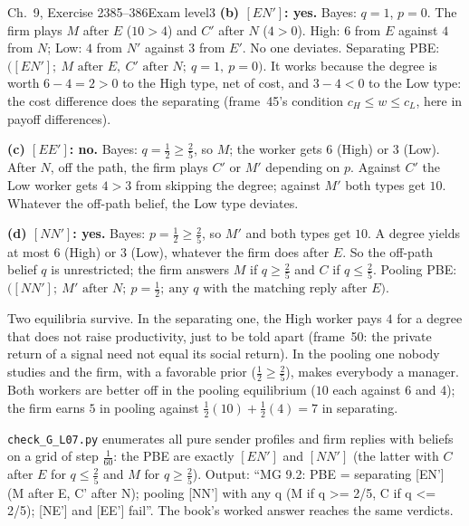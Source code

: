 \begin{exsol}{\MG{} Ch.~9, Exercise 2}{385--386}{Exam level}{3}
\textbf{(b) $[EN']$: yes.} Bayes: $q = 1$, $p = 0$. The firm plays $M$ after $E$ ($10 > 4$) and $C'$ after
$N$ ($4 > 0$). High: $6$ from $E$ against $4$ from $N$; Low: $4$ from $N'$ against $3$ from $E'$. No one
deviates. Separating PBE: $\bigl([EN'];\ M \text{ after } E,\ C' \text{ after } N;\ q = 1,\ p = 0\bigr)$.
It works because the degree is worth $6 - 4 = 2 > 0$ to the High type, net of cost, and $3 - 4 < 0$ to the
Low type: the cost difference does the separating (frame~45's condition $c_H \le w \le c_L$, here in
payoff differences).

\textbf{(c) $[EE']$: no.} Bayes: $q = \frac12 \ge \frac25$, so $M$; the worker gets $6$ (High) or $3$
(Low). After $N$, off the path, the firm plays $C'$ or $M'$ depending on $p$. Against $C'$ the Low worker
gets $4 > 3$ from skipping the degree; against $M'$ both types get $10$. Whatever the off-path belief, the
Low type deviates.

\textbf{(d) $[NN']$: yes.} Bayes: $p = \frac12 \ge \frac25$, so $M'$ and both types get $10$. A degree yields
at most $6$ (High) or $3$ (Low), whatever the firm does after $E$. So the off-path belief $q$ is
unrestricted; the firm answers $M$ if $q \ge \frac25$ and $C$ if $q \le \frac25$. Pooling PBE:
$\bigl([NN'];\ M' \text{ after } N;\ p = \frac12;\ \text{any } q \text{ with the matching reply after } E\bigr)$.

\interp Two equilibria survive. In the separating one, the High worker pays $4$ for a degree that does not
raise productivity, just to be told apart (frame~50: the private return of a signal need not equal its
social return). In the pooling one nobody studies and the firm, with a favorable prior ($\frac12 \ge \frac25$),
makes everybody a manager. Both workers are better off in the pooling equilibrium ($10$ each against $6$
and $4$); the firm earns $5$ in pooling against $\frac12(10) + \frac12(4) = 7$ in separating.

\verify \texttt{check\_G\_L07.py} enumerates all pure sender profiles and firm replies with beliefs on a grid of
step $\frac1{60}$: the PBE are exactly $[EN']$ and $[NN']$ (the latter with $C$ after $E$ for $q \le \frac25$ and
$M$ for $q \ge \frac25$). Output: ``MG 9.2: PBE = separating [EN'] (M after E, C' after N); pooling [NN'] with any
q (M if q >= 2/5, C if q <= 2/5); [NE'] and [EE'] fail''. The book's worked answer reaches the same verdicts.


\end{exsol}
